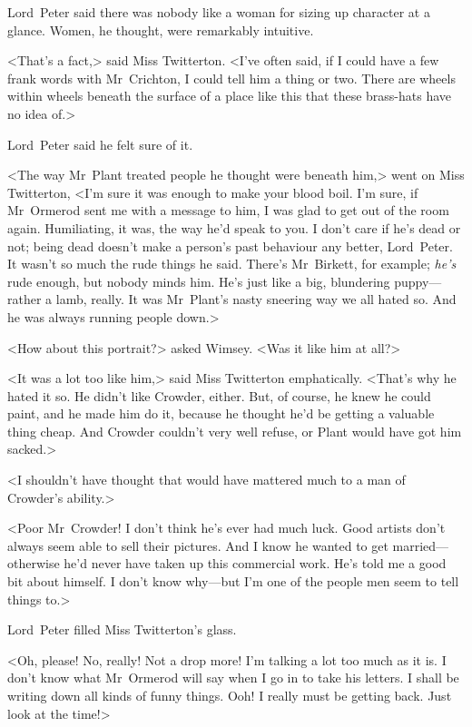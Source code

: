 Lord~Peter said there was nobody like a woman for sizing up character at a glance. Women, he thought, were remarkably intuitive.

<That's a fact,> said Miss Twitterton. <I've often said, if I could have a few frank words with Mr~Crichton, I could tell him a thing or two. There are wheels within wheels beneath the surface of a place like this that these brass-hats have no idea of.>

Lord~Peter said he felt sure of it.

<The way Mr~Plant treated people he thought were beneath him,> went on Miss Twitterton, <I'm sure it was enough to make your blood boil. I'm sure, if Mr~Ormerod sent me with a message to him, I was glad to get out of the room again. Humiliating, it was, the way he'd speak to you. I don't care if he's dead or not; being dead doesn't make a person's past behaviour any better, Lord~Peter. It wasn't so much the rude things he said. There's Mr~Birkett, for example; \textit{he's} rude enough, but nobody minds him. He's just like a big, blundering puppy—rather a lamb, really. It was Mr~Plant's nasty sneering way we all hated so. And he was always running people down.>

<How about this portrait?> asked Wimsey. <Was it like him at all?>

<It was a lot too like him,> said Miss Twitterton emphatically. <That's why he hated it so. He didn't like Crowder, either. But, of course, he knew he could paint, and he made him do it, because he thought he'd be getting a valuable thing cheap. And Crowder couldn't very well refuse, or Plant would have got him sacked.>

<I shouldn't have thought that would have mattered much to a man of Crowder's ability.>

<Poor Mr~Crowder! I don't think he's ever had much luck. Good artists don't always seem able to sell their pictures. And I know he wanted to get married—otherwise he'd never have taken up this commercial work. He's told me a good bit about himself. I don't know why—but I'm one of the people men seem to tell things to.>

Lord~Peter filled Miss Twitterton's glass.

<Oh, please! No, really! Not a drop more! I'm talking a lot too much as it is. I don't know what Mr~Ormerod will say when I go in to take his letters. I shall be writing down all kinds of funny things. Ooh! I really must be getting back. Just look at the time!>

